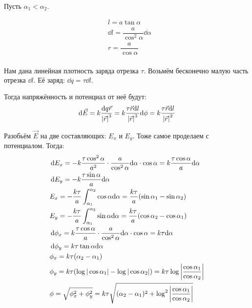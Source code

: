 \documentclass[12pt]{report}
\begin{document}
Пусть $\alpha_1 < \alpha_2$.

\begin{align*}
     & l = a\tan \alpha                            \\
     & \dd l = \dfrac{a }{\cos^2 \alpha}\dd \alpha \\
     & r = \dfrac{a}{\cos \alpha}                  \\
\end{align*}

Нам дана линейная плотность заряда отрезка $\tau$. Возьмём бесконечно малую часть отрезка $\dd l$. Её заряд: $\dd q = \tau \dd l$.

Тогда напряжённость и потенциал от неё будут:
\[
    \dd \vec{E} = k \dfrac{\dd q \vec{r}}{\abs{\vec{r}}^3} = k \dfrac{\tau \vec{r} \dd l}{\abs{\vec{r}}^3}
    \\
    \dd \phi = k \dfrac{\tau \vec{r} \dd l}{\abs{\vec{r}}^2}
\]

Разобьём $\vec E$ на две составляющих: $E_x$ и $E_y$. Тоже самое проделаем с потенциалом. Тогда:
\begin{align*}
     & \dd {E_x} = -k \dfrac{\tau \cos^2 \alpha}{a^2} \cdot \dfrac{a}{\cos^2 \alpha} \dd \alpha \cdot \cos{\alpha} = k \dfrac{\tau \cos{\alpha}}{a}\dd \alpha \\
     & \dd {E_y} = -k \dfrac{\tau \sin{\alpha}}{a}\dd \alpha                                                                                                  \\
     & E_x = -\dfrac{k \tau}{a}\int_{\alpha_1}^{\alpha_2} \cos{\alpha}\dd \alpha = \dfrac{k \tau}{a}(\sin{\alpha_1} - \sin{\alpha_2})                         \\
     & E_y = -\dfrac{k \tau}{a}\int_{\alpha_1}^{\alpha_2} \sin{\alpha}\dd \alpha = \dfrac{k \tau}{a}(\cos{\alpha_2} - \cos{\alpha_1})                         \\
     & \dd {\phi_x} = k \dfrac{\tau \cos \alpha}{a} \cdot \dfrac{a}{\cos^2 \alpha} \dd \alpha \cdot \cos{\alpha} = k\tau\dd \alpha                            \\
     & \dd {\phi_y} = k \tau \tan{\alpha}\dd \alpha                                                                                                           \\
     & \phi_x = k\tau(\alpha_2 - \alpha_1)                                                                                                                    \\
     & \phi_y = k\tau(\log|\cos \alpha_1| - \log|\cos \alpha_2|) = k \tau \log\vqty{\dfrac{\cos \alpha_1}{\cos \alpha_2}}                                     \\
     & \phi = \sqrt{\phi_x^2 + \phi_y^2} = k\tau\sqrt{(\alpha_2 - \alpha_1)^2 + \log^2\vqty{\dfrac{\cos \alpha_1}{\cos \alpha_2}}}
\end{align*}
\end{document}
